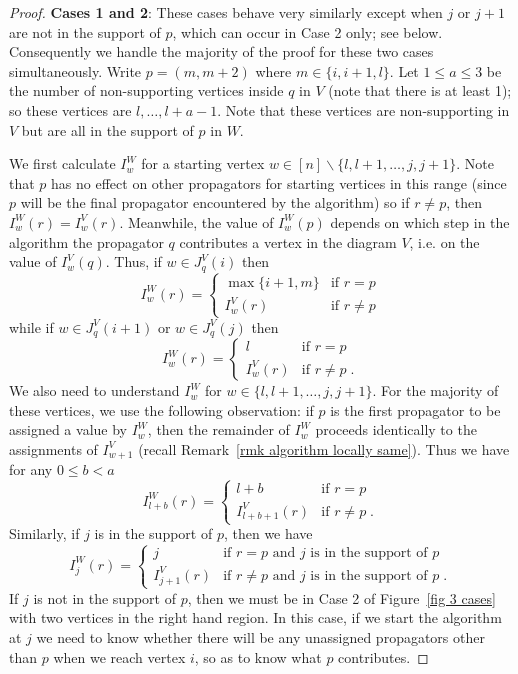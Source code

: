 \documentclass[11pt]{article}
\theoremstyle{remark}
\theoremstyle{definition}
\begin{document}
\begin{proof}

\textbf{Cases 1 and 2}: These cases behave very similarly except when $j$ or $j+1$ are not in the support of $p$, which can occur in Case 2 only; see below. Consequently we handle the majority of the proof for these two cases simultaneously. Write $p=(m,m+2)$ where $m\in \{i, i+1, l\}$. Let $1\leq a\leq 3$ be the number of non-supporting vertices inside $q$ in $V$ (note that there is at least 1); so these vertices are $l, \ldots, l+a-1$.  Note that these vertices are non-supporting in $V$ but are all in the support of $p$ in $W$. 

We first calculate $I^{W}_w$ for a starting vertex ${w \in [n]\backslash \{l, l+1, \ldots,j,j+1\}}$. Note that $p$ has no effect on other propagators for starting vertices in this range (since $p$ will be the final propagator encountered by the algorithm) so if $r \neq p$, then $I_w^W(r) = I_w^V(r)$. Meanwhile, the value of $I^{W}_w(p)$ depends on which step in the algorithm the propagator $q$ contributes a vertex in the diagram $V$, i.e. on the value of $I^{V}_w(q)$. Thus, if $w\in J_q^{V}(i)$ then 
    \[
    I_w^{W}(r) =  \begin{cases}
        \max\{i+1, m\} & \text{if } r=p \\
        I_{w}^{V}(r) & \text{if } r\neq p
      \end{cases} 
    \]
    while if $w\in J_q^{V}(i+1)$ or $w\in J_q^{V}(j)$ then
    \[
    I_w^{W}(r) =  \begin{cases}
        l & \text{if } r=p \\
        I_{w}^{V}(r) & \text{if } r\neq p \;.
      \end{cases} 
      \]
We also need to understand $I^{W}_w$ for $w \in \{l,l+1,\ldots,j,j+1\}$. For the majority 
of these vertices, we use the following observation: if $p$ is the first propagator to be assigned a value by $I_w^{W}$, then the remainder of $I_w^{W}$ proceeds identically to the assignments of $I^{V}_{w+1}$ (recall Remark~\ref{rmk algorithm locally same}).  Thus we have for any $0\leq b <a$
    \[
    I_{l+b}^{W}(r) = \begin{cases}
      l+b & \text{if } r=p\\
      I_{l+b+1}^{V}(r) & \text{if } r\neq p\;.
    \end{cases}
    \]
Similarly, if $j$ is in the support of $p$, then we have
     \[
       I_j^{W}(r) = \begin{cases}
         j & \text{if $r=p$ and $j$ is in the support of $p$}\\
         I_{j+1}^{V}(r) & \text{if $r\neq p$ and $j$ is in the support of $p$} \;.
       \end{cases} 
       \]
If $j$ is not in the support of $p$, then we must be in Case 2 of Figure~\ref{fig 3 cases} with two vertices in the right hand region.  In this case, if we start the algorithm at $j$ we need to know whether there will be any unassigned propagators other than $p$ when we reach vertex $i$, so as to know what $p$ contributes.


\end{proof}
\end{document}
